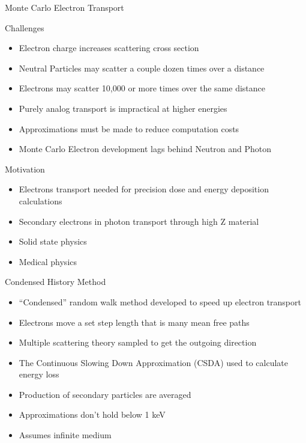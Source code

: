 \documentclass{beamer}
\begin{document}
\begin{frame}{Monte Carlo Electron Transport}

  \begin{block}{Challenges}
    \begin{itemize}
      \item Electron charge increases scattering cross section
      \item Neutral Particles may scatter a couple dozen times over a distance
      \item Electrons may scatter 10,000 or more times over the same distance
      \item Purely analog transport is impractical at higher energies
      \item Approximations must be made to reduce computation costs
      \item Monte Carlo Electron development lags behind Neutron and Photon
    \end{itemize}
  \end{block}
    
  \begin{block}{Motivation}
    \begin{itemize}
      \item Electrons transport needed for precision dose and energy deposition calculations
      \item Secondary electrons in photon transport through high Z material
      \item Solid state physics
      \item Medical physics
    \end{itemize}    
  \end{block}  

\end{frame}

\begin{frame}{Condensed History Method}

  \begin{itemize}
    \item ``Condensed'' random walk method developed to speed up electron transport
    \item Electrons move a set step length that is many mean free paths 
    \item Multiple scattering theory sampled to get the outgoing direction
    \item The Continuous Slowing Down Approximation (CSDA) used to calculate energy loss
    \item Production of secondary particles are averaged
    \item Approximations don't hold below 1 keV
    \item Assumes infinite medium 
  \end{itemize}

\end{frame}
\end{document}
